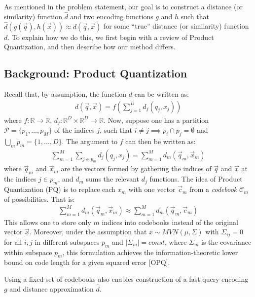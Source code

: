 
As mentioned in the problem statement, our goal is to construct a distance (or similarity) function $\hat{d}$ and two encoding functions $g$ and $h$ such that $\hat{d}(g(\vec{q}), h(\vec{x})) \approx d(\vec{q}, \vec{x})$ for some ``true'' distance (or similarity) function $d$. To explain how we do this, we first begin with a review of Product Quantization, and then describe how our method differs.

\subsection{Background: Product Quantization}

Recall that, by assumption, the function $d$ can be written as:
\begin{align*}
        d(\vec{q}, \vec{x}) = f(\sum_{j=1}^D d_j(q_j, x_j))
\end{align*}
where $f: \mathbb{R} \rightarrow \mathbb{R}$, $d_j: \mathbb{R}^D \times \mathbb{R}^D \rightarrow \mathbb{R}$. Now, suppose one has a partition $\mathcal{P} = \{p_1,\ldots,p_M \}$ of the indices $j$, such that $i \ne j \implies p_i \cap p_j = \emptyset$ and $\bigcup_m p_m = \{1,\ldots,D\}$. The argument to $f$ can then be written as:
\begin{align*}
        \sum_{m=1}^M \sum_{j \in p_m} d_j(q_j, x_j)
            = \sum_{m=1}^M d_m(\vec{q}_m, \vec{x}_m)
\end{align*}
where $\vec{q}_m$ and $\vec{x}_m$ are the vectors formed by gathering the indices of $\vec{q}$ and $\vec{x}$ at the indices $j \in p_m$, and $d_m$ sums the relevant $d_j$ functions. The idea of Product Quantization (PQ) is to replace each $x_m$ with one vector $\vec{c}_m$ from a \textit{codebook} $\mathcal{C}_m$ of possibilities. That is: %
\begin{align*}
        \sum_{m=1}^M d_m(\vec{q}_m, \vec{x}_m) \approx \sum_{m=1}^M d_m(\vec{q}_m, \vec{c}_m)
\end{align*}
This allows one to store only $m$ indices into codebooks instead of the original vector $\vec{x}$. Moreover,  under the assumption that $x \sim MVN(\mu, \Sigma)$ with $\Sigma_{ij} = 0$ for all $i, j$ in different subspaces $p_m$ and $|\Sigma_m| = const$, where $\Sigma_m$ is the covariance within subspace $p_m$, this formulation achieves the information-theoretic lower bound on code length for a given squared error [OPQ].

Using a fixed set of codebooks also enables construction of a fast query encoding $g$ and distance approximation $\hat{d}$.


